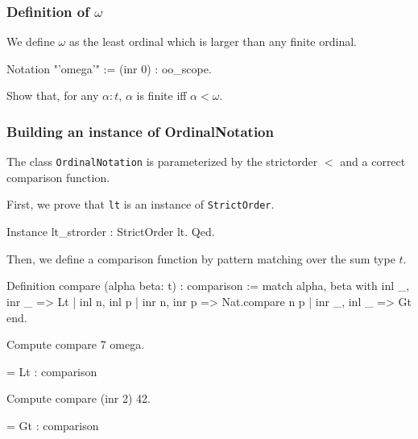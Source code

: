 \subsubsection{Definition of \texorpdfstring{$\omega$}{omega}}

We define $\omega$ as the least ordinal which is larger than any finite ordinal.

\begin{Coqsrc}
 Notation  "'omega'"  := (inr 0) : oo_scope. 
\end{Coqsrc}

\begin{exercise}
Show that, for any $\alpha:t$, $\alpha$ is finite iff $\alpha<\omega$.
\end{exercise}


\subsubsection{Building an instance of OrdinalNotation}

The class \texttt{OrdinalNotation} is parameterized by the strictorder $<$ and a correct comparison function.

First, we prove that \texttt{lt} is an instance of \texttt{StrictOrder}.

\begin{Coqsrc}
Instance lt_strorder : StrictOrder lt.
Qed.
\end{Coqsrc}

Then, we define a comparison function by pattern matching over the sum type $t$.

\begin{Coqsrc}
Definition compare (alpha beta: t) : comparison :=
   match alpha, beta with
     inl _, inr _ => Lt
   | inl n, inl p | inr n, inr p => Nat.compare n p
   | inr _, inl _ => Gt
  end.
\end{Coqsrc}

\begin{Coqsrc}
Compute compare 7 omega.
\end{Coqsrc}

\begin{Coqanswer}
= Lt : comparison
\end{Coqanswer}


\begin{Coqsrc}
Compute compare  (inr 2) 42.
\end{Coqsrc}
 
\begin{Coqanswer}
= Gt : comparison
\end{Coqanswer}

